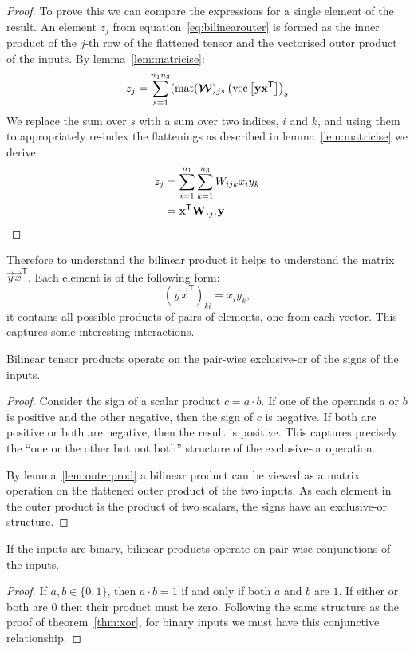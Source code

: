 \begin{proof}
To
prove this we can compare the expressions for a single element of the result.
An element \(z_j\) from equation~\ref{eq:bilinearouter}
is formed as the inner product of the \(j\)-th
row of the flattened tensor and the vectorised outer product of the inputs. By 
lemma~\ref{lem:matricise}:
\begin{equation}
	z_j = 
	\sum_{s=1}^{n_1n_3} (\operatorname{mat}(\bm{\mathcal{W}})_{js} 
	\left( \operatorname{vec}\left[\mathbf{y}\mathbf{x}^\mathsf{T}\right]\right)_s
\end{equation}
We replace the sum over \(s\) with a sum over two
indices, \(i\) and \(k\), and using them to appropriately re-index the flattenings 
as described in lemma~\ref{lem:matricise} we 
derive
\begin{align}
	z_j &= \sum_{i=1}^{n_1}\sum_{k=1}^{n_3} W_{ijk} x_i y_k \\
		&= \vec{x}^\mathsf{T}\mat{W}_{\midbullet j \midbullet}\vec{y}
\end{align}

\end{proof}


Therefore to understand the bilinear product it helps to understand the matrix 
\(\vec{y}\vec{x}^\mathsf{T}\). Each element is of the following form:
\[
	(\vec{y}\vec{x}^\mathsf{T})_{ki} = x_iy_k,
\] it contains all possible products of pairs of elements, one from each vector. 
This captures some interesting interactions.

\begin{thm}  \label{thm:xor}
Bilinear tensor products operate on the pair-wise exclusive-or of the
signs of the inputs.
\end{thm}
\begin{proof}
Consider the sign of a scalar product
\(c = a\cdot b\). If one of the operands \(a\) or \(b\) is positive and the other negative,
then the sign of \(c\) is negative. If both are positive or both are negative, then the
result is positive. This captures precisely the ``one or the other but not both'' structure
of the exclusive-or operation.

By lemma~\ref{lem:outerprod} a bilinear product can be viewed as a matrix operation on the flattened
outer product of the two inputs. As each element in the outer product is the product of two scalars,
the signs have an exclusive-or structure.
\end{proof}

\begin{cor}\label{cor:and}
If the inputs are binary, bilinear products operate on pair-wise conjunctions of the inputs.
\end{cor}
\begin{proof}
If \(a, b \in \{0, 1\}\), then \(a \cdot b = 1\) if and only if both \(a\) and \(b\) are \(1\). If
either or both are \(0\) then their product must be zero. Following the same structure as the proof
of theorem~\ref{thm:xor}, for binary inputs we must have this conjunctive relationship.
\end{proof}


